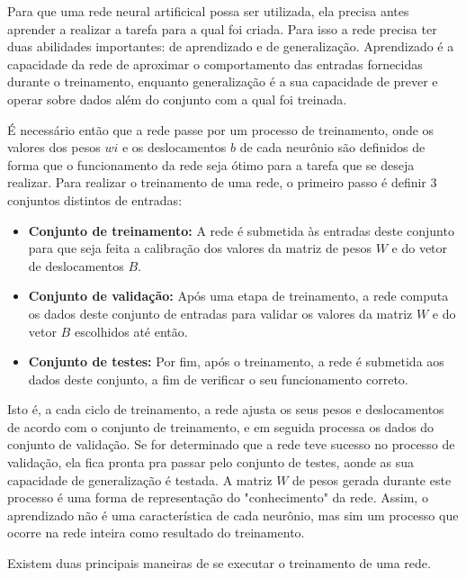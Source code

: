 Para que uma rede neural artificical possa ser utilizada, ela precisa antes aprender a realizar a tarefa para a qual foi criada. Para isso a rede precisa ter duas abilidades importantes: de aprendizado e de generalização. Aprendizado é a capacidade da rede de aproximar o comportamento das entradas fornecidas durante o treinamento, enquanto generalização é a sua capacidade de prever e operar sobre dados além do conjunto com a qual foi treinada\cite{ZhangNNSurvey}.

É necessário então que a rede passe por um processo de treinamento, onde os valores dos pesos $wi$ e os deslocamentos $b$ de cada neurônio são definidos de forma que o funcionamento da rede seja ótimo para a tarefa que se deseja realizar. Para realizar o treinamento de uma rede, o primeiro passo é definir 3 conjuntos distintos de entradas:

\begin{itemize}
	\item \textbf{Conjunto de treinamento:} A rede é submetida às entradas deste conjunto para que seja feita a calibração dos valores da matriz de pesos $W$ e do vetor de deslocamentos $B$.
	
	\item \textbf{Conjunto de validação:} Após uma etapa de treinamento, a rede computa os dados deste conjunto de entradas para validar os valores da matriz $W$ e do vetor $B$ escolhidos até então.
	
	\item \textbf{Conjunto de testes:} Por fim, após o treinamento, a rede é submetida aos dados deste conjunto, a fim de verificar o seu funcionamento correto.
\end{itemize}

Isto é, a cada ciclo de treinamento, a rede ajusta os seus pesos e deslocamentos de acordo com o conjunto de treinamento, e em seguida processa os dados do conjunto de validação. Se for determinado que a rede teve sucesso no processo de validação, ela fica pronta pra passar pelo conjunto de testes, aonde as sua capacidade de generalização é testada. A matriz $W$ de pesos gerada durante este processo é uma forma de representação do "conhecimento" da rede. Assim, o aprendizado não é uma característica de cada neurônio, mas sim um processo que ocorre na rede inteira como resultado do treinamento\cite{Kozabov}.

Existem duas principais maneiras de se executar o treinamento de uma rede.

